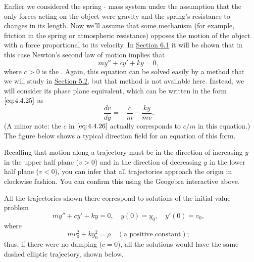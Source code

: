 \documentclass{ximera}
\begin{document}
Earlier we considered
the spring - mass system under the assumption that the only forces
acting on the object were gravity and the spring's resistance to
changes in its length. Now we'll assume that some mechanism (for
example, friction in the spring or atmospheric resistance) opposes the
motion of the object with a force proportional to its velocity. In \href{https://xerxes.ximera.org/differentialequations/main/springProblemsI/springProblemsI}{Section 6.1} it will be shown that in this case Newton's
second law of motion implies that
\begin{equation}\label{eq:4.4.27}
my''+cy'+ky=0,
\end{equation}
where $c>0$ is the . Again, this
equation can
be solved easily by a method that we will study in \href{https://xerxes.ximera.org/differentialequations/main/constantCoefficientHomogeneousEquations/constantCoefficientHomogeneousEquations}{Section 5.2},
but that method is not available here. Instead, we will consider its phase plane equivalent, which can be written in the form $\eqref{eq:4.4.25}$
as
\begin{equation}\label{eq:4.4.28}
\frac{dv}{dy}=-\frac{c}{m}-\frac{ky}{mv}.
\end{equation}
(A minor note: the $c$ in $\eqref{eq:4.4.26}$ actually corresponds to
$c/m$ in this equation.) The figure below shows a
typical direction field for an equation of this form.


\begin{center}
\end{center}

 
 
Recalling that
motion along a trajectory must be in the direction of increasing $y$
in the upper half plane ($v>0$) and in the direction of decreasing $y$
in the lower half plane ($v<0$), you can infer that all trajectories
approach the origin in clockwise fashion. You can confirm this using the Geogebra interactive above.

 
 
 
All the trajectories shown there correspond to
solutions of the initial value problem
$$
my''+cy'+ky=0,\quad y(0)=y_0,\quad y'(0)=v_0,
$$
where
$$
mv_0^2+ky_0^2=\rho\quad (\mbox{a positive constant});
$$
thus, if there were no damping ($c=0$),  all the solutions would
have the same dashed elliptic trajectory, shown below.
\end{document}
